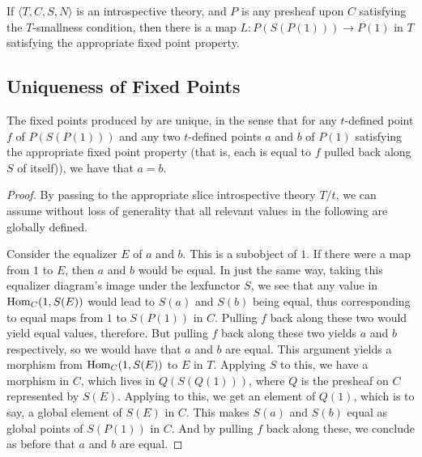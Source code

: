 \begin{corollary}\label{LoebInIntrosp}
If $\langle T, C, S, N \rangle$ is an introspective theory, and $P$ is any presheaf upon $C$ satisfying the $T$-smallness condition, then there is a map $L : P(S(P(1))) \to P(1)$ in $T$ satisfying the appropriate fixed point property.
\end{corollary}

\subsection{Uniqueness of Fixed Points}

\begin{theorem}\label{UniqueFixedPoints}
The fixed points produced by  are unique, in the sense that for any $t$-defined point $f$ of $P(S(P(1)))$ and any two $t$-defined points $a$ and $b$ of $P(1)$ satisfying the appropriate fixed point property (that is, each is equal to $f$ pulled back along $S$ of itself)), we have that $a = b$.
\end{theorem}
\begin{proof}
By passing to the appropriate slice introspective theory $T/t$, we can assume without loss of generality that all relevant values in the following are globally defined. 

Consider the equalizer $E$ of $a$ and $b$. This is a subobject of $1$. If there were a map from $1$ to $E$, then $a$ and $b$ would be equal. In just the same way, taking this equalizer diagram's image under the lexfunctor $S$, we see that any value in $\operatorname{Hom}_C(1, S(E))$ would lead to $S(a)$ and $S(b)$ being equal, thus corresponding to equal maps from $1$ to $S(P(1))$ in $C$. Pulling $f$ back along these two would yield equal values, therefore. But pulling $f$ back along these two yields $a$ and $b$ respectively, so we would have that $a$ and $b$ are equal. This argument yields a morphism from $\operatorname{Hom}_C(1, S(E))$ to $E$ in $T$. Applying $S$ to this, we have a morphism in $C$, which lives in $Q(S(Q(1)))$, where $Q$ is the presheaf on $C$ represented by $S(E)$. Applying  to this, we get an element of $Q(1)$, which is to say, a global element of $S(E)$ in $C$. This makes $S(a)$ and $S(b)$ equal as global points of $S(P(1))$ in $C$. And by pulling $f$ back along these, we conclude as before that $a$ and $b$ are equal. 
\end{proof}

